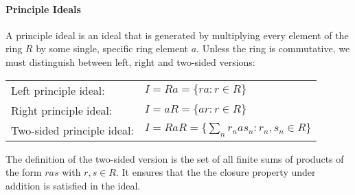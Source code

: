 \paragraph{Principle Ideals} A principle ideal is an ideal that is generated by multiplying every element of the ring $R$ by some single, specific ring element $a$. Unless the ring is commutative, we must distinguish between left, right and two-sided versions:

\medskip
\begin{tabular}{l l}
Left principle ideal:      & $I = R a = \{ r a : r \in R \}$ \\
Right principle ideal:     & $I = a R = \{ a r : r \in R \}$ \\
Two-sided principle ideal: & $I = RaR = \{ \sum_n r_n a s_n : r_n,s_n \in R \} $ \\
\end{tabular}
\medskip

The definition of the two-sided version is the set of all finite sums of products of the form $r a s$ with $r,s \in R$. It ensures that the the closure property under addition is satisfied in the ideal.%







